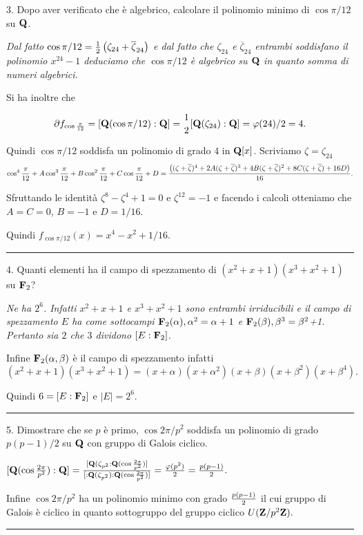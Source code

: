 \item{3.} Dopo aver verificato che \`{e} algebrico, calcolare il
polinomio minimo di $\cos \pi/12$ su ${\bf Q}$.\medskip

{\it Dal fatto $\cos
\pi/12={1\over2}\left(\zeta_{24}+\overline{\zeta}_{24}\right)$ e
dal fatto che $\zeta_{24}$ e $\overline{\zeta}_{24}$ entrambi
soddisfano il polinomio $x^{24}-1$ deduciamo che $\cos \pi/12$
\`{e} algebrico su ${\bf Q}$ in quanto somma di numeri
algebrici.\medskip

Si ha inoltre che

$$\partial f_{\cos{\pi\over12}}=[{\bf Q}(\cos \pi/12):{\bf Q}]= {1\atop2} [{\bf Q}(\zeta_{24}):{\bf Q}]=
\varphi(24)/2=4.$$

Quindi $\cos \pi/12$ soddisfa un polinomio di grado $4$ in ${\bf Q}[x]$. Scriviamo $\zeta=\zeta_{24}$
$$\cos^4 {\pi\over12}+A\cos^3{\pi\over12}+B\cos^2{\pi\over12}+C\cos{\pi\over12}+D=
{\left((\zeta+\overline{\zeta})^4+2A(\zeta+\overline{\zeta})^3+
4B(\zeta+\overline{\zeta})^2+8C(\zeta+\overline{\zeta})+16D\right)\over16}.$$

Sfruttando le identit\`{a} $\zeta^8-\zeta^4+1=0$ e $\zeta^{12}=-1$
e facendo i calcoli otteniamo che $A=C=0$, $B=-1$ e $D=1/16$.\medskip

Quindi \quad\quad\quad$f_{\cos \pi/12}(x)=x^4-x^2+1/16.$
}\medskip\hrule\medskip

\item{4.} Quanti elementi ha il campo di spezzamento di
$(x^2+x+1)(x^3+x^2+1)$ su ${\bf F}_2$?\smallskip

{\it Ne ha $2^6$. Infatti $x^2+x+1$ e $x^3+x^2+1$ sono entrambi irriducibili
e il campo di spezzamento $E$ ha come sottocampi ${\bf F}_2(\alpha),
\alpha^2=\alpha+1$ e ${\bf F}_2(\beta), \beta^3=\beta^2$+1. Pertanto
sia $2$ che $3$ dividono $[E:{\bf F}_2]$.\smallskip

Infine ${\bf F}_2(\alpha,\beta)$ \`{e} il campo di spezzamento infatti
$(x^2+x+1)(x^3+x^2+1)=(x+\alpha)(x+\alpha^2)(x+\beta)(x+\beta^2)(x+\beta^4).$\smallskip

Quindi $6=[E:{\bf F}_2]$ e $|E|=2^6.$}\medskip\hrule\medskip

\item{5.} Dimostrare che se $p$ \`{e} primo, $\cos 2\pi/p^2$
soddisfa un polinomio di grado $p(p-1)/2$ su ${\bf Q}$ con gruppo
di Galois ciclico.\medskip

{\it \centerline{$[{\bf Q}(\cos{2\pi\over
p^2}):{\bf Q}]={[{\bf Q}(\zeta_{p^2}:{\bf Q}(\cos{2\pi\over
p^2})]\over [:{\bf Q}(\zeta_{p^2}):{\bf Q}(\cos{2\pi\over p^2})]}=
{\varphi(p^2)\over 2}={p(p-1)\over 2}.$}\smallskip

Infine $\cos 2\pi/p^2$ ha un polinomio minimo con grado
${p(p-1)\over 2}$ il cui gruppo di Galois \`{e} ciclico in quanto
sottogruppo del gruppo ciclico $U({\bf Z}/p^2{\bf
Z}).$}\medskip\hrule\medskip

